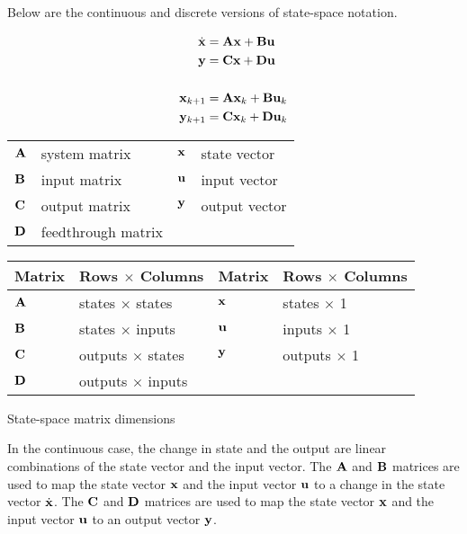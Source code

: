 Below are the continuous and discrete versions of state-space notation.

\begin{definition}%

  \begin{align}
    \dot{\mathbf{x}} &= \mathbf{A}\mathbf{x} + \mathbf{B}\mathbf{u} \label{eq:ss_ctrl_x} \\
    \mathbf{y} &= \mathbf{C}\mathbf{x} + \mathbf{D}\mathbf{u} \label{eq:ss_ctrl_y} \\
    \nonumber \\
    \mathbf{x}_{k+1} &= \mathbf{A}\mathbf{x}_k + \mathbf{B}\mathbf{u}_k \label{eq:ssz_ctrl_x} \\
    \mathbf{y}_{k+1} &= \mathbf{C}\mathbf{x}_k + \mathbf{D}\mathbf{u}_k \label{eq:ssz_ctrl_y}
  \end{align}

  \begin{figurekey}
    \begin{tabular}{llll}
      $\mathbf{A}$ & system matrix      & $\mathbf{x}$ & state vector \\
      $\mathbf{B}$ & input matrix       & $\mathbf{u}$ & input vector \\
      $\mathbf{C}$ & output matrix      & $\mathbf{y}$ & output vector \\
      $\mathbf{D}$ & feedthrough matrix &  &  \\
    \end{tabular}
  \end{figurekey}
\end{definition}

\begin{booktable}
  \begin{tabular}{|ll|ll|}
    \hline
    \rowcolor{headingbg}
    \textbf{Matrix} & \textbf{Rows $\times$ Columns} &
    \textbf{Matrix} & \textbf{Rows $\times$ Columns} \\
    \hline
    $\mathbf{A}$ & states $\times$ states & $\mathbf{x}$ & states $\times$ 1 \\
    $\mathbf{B}$ & states $\times$ inputs & $\mathbf{u}$ & inputs $\times$ 1 \\
    $\mathbf{C}$ & outputs $\times$ states & $\mathbf{y}$ & outputs $\times$ 1 \\
    $\mathbf{D}$ & outputs $\times$ inputs &  &  \\
    \hline
  \end{tabular}
  \caption{State-space matrix dimensions}
  \label{tab:ss_matrix_dims}
\end{booktable}

In the continuous case, the change in \gls{state} and the \gls{output} are
linear combinations of the \gls{state} vector and the \gls{input} vector. The
$\mathbf{A}$ and $\mathbf{B}$ matrices are used to map the \gls{state} vector
$\mathbf{x}$ and the \gls{input} vector $\mathbf{u}$ to a change in the \gls{state}
vector $\dot{\mathbf{x}}$. The $\mathbf{C}$ and $\mathbf{D}$ matrices are used to map the
\gls{state} vector $\mathbf{x}$ and the \gls{input} vector $\mathbf{u}$ to an
\gls{output} vector $\mathbf{y}$.
